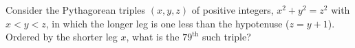 Consider the Pythagorean triples $(x,y,z)$ of positive integers, $x^2+y^2=z^2$ with $x<y<z$, in which the longer leg is one less than the hypotenuse ($z=y+1$). Ordered by the shorter leg $x$, what is the $79^{\text{th}}$ such triple?
